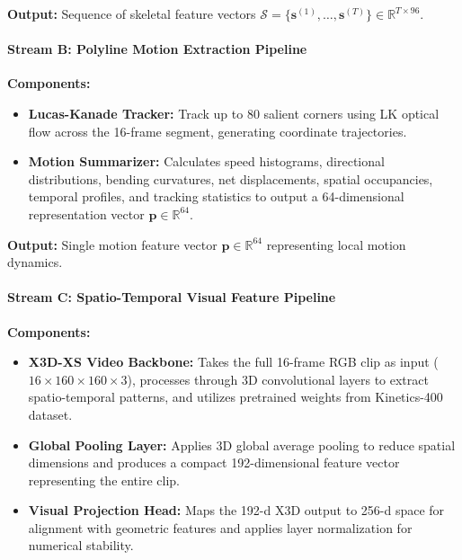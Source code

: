 \documentclass[12pt]{article}
\begin{document}
\textbf{Output:} Sequence of skeletal feature vectors $\mathcal{S} = \{\mathbf{s}^{(1)}, \ldots, \mathbf{s}^{(T)}\} \in \mathbb{R}^{T \times 96}$.

\paragraph{Stream B: Polyline Motion Extraction Pipeline}

\textbf{Components:}
\begin{itemize}
    \item \textbf{Lucas-Kanade Tracker:} Track up to 80 salient corners using LK optical flow across the 16-frame segment, generating coordinate trajectories.
    
    \item \textbf{Motion Summarizer:} Calculates speed histograms, directional distributions, bending curvatures, net displacements, spatial occupancies, temporal profiles, and tracking statistics to output a 64-dimensional representation vector $\mathbf{p} \in \mathbb{R}^{64}$.
\end{itemize}

\textbf{Output:} Single motion feature vector $\mathbf{p} \in \mathbb{R}^{64}$ representing local motion dynamics.

\paragraph{Stream C: Spatio-Temporal Visual Feature Pipeline}

\textbf{Components:}
\begin{itemize}
    \item \textbf{X3D-XS Video Backbone:} Takes the full 16-frame RGB clip as input ($16 \times 160 \times 160 \times 3$), processes through 3D convolutional layers to extract spatio-temporal patterns, and utilizes pretrained weights from Kinetics-400 dataset.
    
    \item \textbf{Global Pooling Layer:} Applies 3D global average pooling to reduce spatial dimensions and produces a compact 192-dimensional feature vector representing the entire clip.
    
    \item \textbf{Visual Projection Head:} Maps the 192-d X3D output to 256-d space for alignment with geometric features and applies layer normalization for numerical stability.
\end{itemize}
\end{document}
